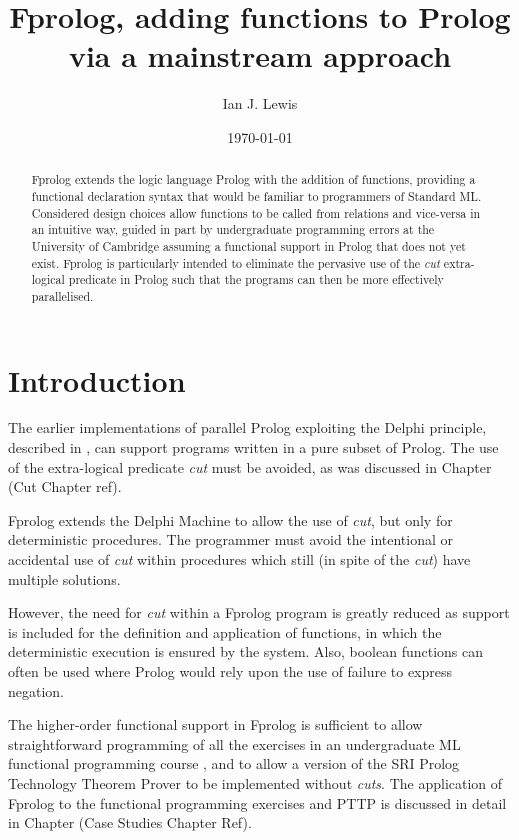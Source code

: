 \documentclass[a4paper,11pt,twoside]{article}
\author{Ian J. Lewis}
\date{\today}
\title{Fprolog, adding functions to Prolog via a mainstream approach}
\begin{document}
\maketitle

\begin{abstract}
    Fprolog extends the logic language Prolog with the addition of functions,
    providing a functional declaration syntax that would be familiar to programmers of
    Standard ML. Considered design choices allow functions to be called from relations and vice-versa
    in an intuitive way, guided in part by undergraduate programming errors at the University of
    Cambridge assuming a functional support in Prolog that does not yet exist.
    Fprolog is particularly intended to eliminate the pervasive use of the \textit{cut} extra-logical
    predicate in Prolog such that the programs can then be more effectively parallelised.
\end{abstract}

\setlength{\parskip}{8pt}

\pagestyle{headings}

\label{functions}

\section{Introduction} %

The earlier implementations of parallel Prolog exploiting the Delphi
principle, described in \cite{CA87,Clo87,Wre90,Kle91,Sar95},
can support programs written in a pure subset of Prolog.  The use of
the extra-logical predicate \textit{cut} must be avoided, as was discussed in
Chapter (Cut Chapter ref).

Fprolog extends the Delphi Machine to allow the use of \textit{cut},
but only for
deterministic procedures.  The programmer must avoid the
intentional or accidental use of \textit{cut} within
procedures which still (in spite of the \textit{cut}) have
multiple solutions.  

However, the need for \textit{cut} within a
Fprolog program is greatly reduced as
support is included for the definition and application
of functions, in which the deterministic
execution is ensured by the system.  Also, boolean functions can often
be used where Prolog would rely upon the use of failure to express negation.

The higher-order functional support in Fprolog is sufficient to allow
straightforward programming of all the exercises in an undergraduate ML
functional programming course \cite{Pau88}, and to allow a version of the SRI Prolog 
Technology Theorem Prover \cite{Sti88} to be implemented without \textit{cuts}.
The application of Fprolog to the functional programming exercises and PTTP is
discussed in detail in Chapter (Case Studies Chapter Ref).
\end{document}
